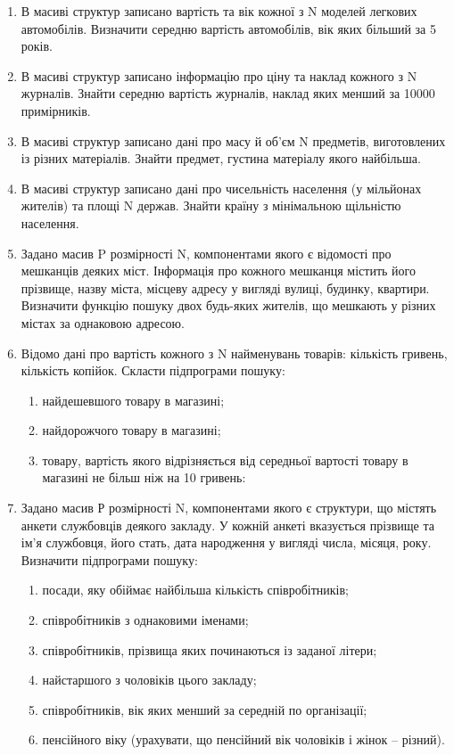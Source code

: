 \documentclass[a5paper,titlepage,openany,twoside,
]
{book_unv}%
\makeatletter
\newcommand{\xslalph}[1]{\expandafter\@xslalph\csname c@#1\endcsname}
\newcommand{\@xslalph}[1]{%
    \ifcase#1\or а\or б\or в\or г\or д\or e\or є\or ж\or з\or i%
    \or й\or к\or л\or м\or н\or о\or п\or р\or с\or т%
    \or у\or ф\or х\or ц\or ч\or ш\or ю\or я\or аа\or бб\or вв%
    \else\@ctrerr\fi%
}
\makeatother
\begin{document}
\begin{enumerate}
\begin{enumerate}
\item
  В масиві структур записано вартість та вік кожної з N моделей легкових
  автомобілів. Визначити середню вартість автомобілів, вік яких більший
  за 5 років.
\item
  В масиві структур записано інформацію про ціну та наклад кожного з N
  журналів. Знайти середню вартість журналів, наклад яких менший за
  10000 примірників.
\item
  В масиві структур записано дані про масу й об'єм N предметів,
  виготовлених із різних матеріалів. Знайти предмет, густина матеріалу
  якого найбільша.
\item
  В масиві структур записано дані про чисельність населення (у мільйонах
  жителів) та площі N держав. Знайти країну з мінімальною щільністю
  населення.
\item
  Задано масив P розмірності N, компонентами якого є відомості про
  мешканців деяких міст. Інформація про кожного мешканця містить його
  прізвище, назву міста, місцеву адресу у вигляді вулиці, будинку,
  квартири. Визначити функцію пошуку двох будь-яких жителів, що мешкають
  у різних містах за однаковою адресою.
\item
  Відомо дані про вартість кожного з N найменувань товарів: кількість
  гривень, кількість копійок. Скласти підпрограми пошуку:
\begin{enumerate}[label=\xslalph*)]
\item найдешевшого товару в магазині;
\item найдорожчого товару в магазині;
\item товару, вартість якого відрізняється від середньої вартості 
товару в магазині не більш ніж на 10 гривень:

\end{enumerate}

\item
  Задано масив Р розмірності N, компонентами якого є структури, що
  містять анкети службовців деякого закладу. У кожній анкеті вказується
  прізвище та ім'я службовця, його стать, дата народження у вигляді
  числа, місяця, року. Визначити підпрограми пошуку:
\begin{enumerate}[label=\xslalph*)]
\item посади, яку обіймає найбільша кількість співробітників;
\item співробітників з однаковими іменами;
\item співробітників, прізвища яких починаються із заданої літери;
\item найстаршого з чоловіків цього закладу;
\item співробітників, вік яких менший за середній по організації;
\item пенсійного віку (урахувати, що пенсійний вік чоловіків і жінок --
різний).
\end{enumerate}


\end{enumerate}
\end{enumerate}
\end{document}
